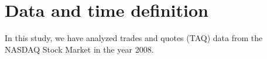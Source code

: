 \section{Data and time definition}\label{sec:data_time}

In this study, we have analyzed trades and quotes (TAQ) data from the NASDAQ
Stock Market in the year 2008. 